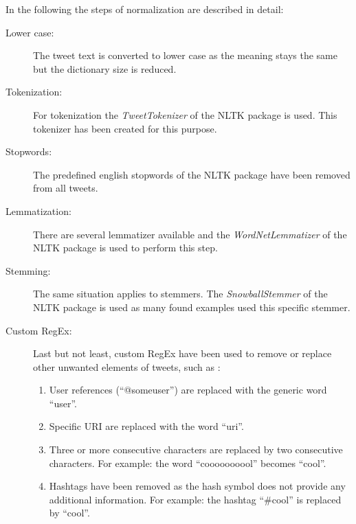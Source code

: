 In the following the steps of normalization are described in detail:

\begin{description}

  \item [Lower case:]
    The tweet text is converted to lower case as the meaning stays the same but the dictionary size is reduced.

  \item [Tokenization:]
    For tokenization the \emph{TweetTokenizer} of the NLTK package is used.
    This tokenizer has been created for this purpose.

  \item [Stopwords:]
    The predefined english stopwords of the NLTK package have been removed from all tweets.
  
  \item [Lemmatization:]
    There are several lemmatizer available and the \emph{WordNetLemmatizer} of the NLTK package is used to perform this step.

  \item [Stemming:]
    The same situation applies to stemmers.
    The \emph{SnowballStemmer} of the NLTK package is used as many found examples used this specific stemmer.

  \item [Custom \ac{RegEx}:]
    Last but not least, custom \ac{RegEx} have been used to remove or replace other unwanted elements of tweets, such as \cite{Pagolu2016a}:

    \begin{enumerate}
      \item User references (``@someuser'') are replaced with the generic word ``user''.
      \item Specific URI are replaced with the word ``uri''.
      \item Three or more consecutive characters are replaced by two consecutive characters.
        For example: the word ``coooooooool'' becomes ``cool''.
      \item Hashtags have been removed as the hash symbol does not provide any additional information. 
        For example: the hashtag ``\#cool'' is replaced by ``cool''.
    \end{enumerate}

\end{description}

